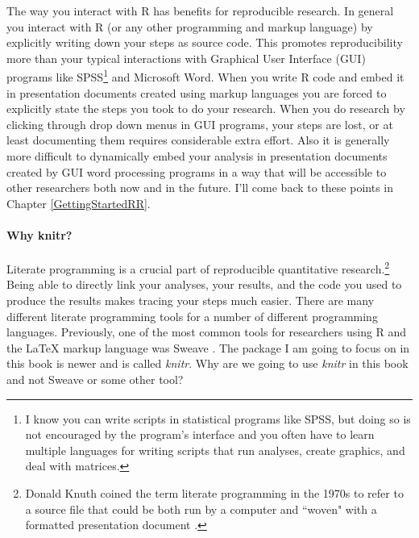 \documentclass[krantz1]{krantz}
\begin{document}
The way you interact with R has benefits for reproducible research. In general you interact with R (or any other programming and markup language) by explicitly writing down your steps as source code. This promotes reproducibility more than your typical interactions with Graphical User Interface (GUI) programs like SPSS\footnote{I know you can write scripts in statistical programs like SPSS, but doing so is not encouraged by the program's interface and you often have to learn multiple languages for writing scripts that run analyses, create graphics, and deal with matrices.} and Microsoft Word. When you write R code and embed it in presentation documents created using markup languages you are forced to explicitly state the steps you took to do your research. When you do research by clicking through drop down menus in GUI programs, your steps are lost, or at least documenting them requires considerable extra effort. Also it is generally more difficult to dynamically embed your analysis in presentation documents created by GUI word processing programs in a way that will be accessible to other researchers both now and in the future. I'll come back to these points in Chapter \ref{GettingStartedRR}.

\paragraph{Why knitr?}

Literate programming is a crucial part of reproducible quantitative research.\footnote{Donald Knuth coined the term literate programming in the 1970s to refer to a source file that could be both run by a computer and ``woven" with a formatted presentation document \cite[]{Knuth1992}.} Being able to directly link your analyses, your results, and the code you used to produce the results makes tracing your steps much easier. There are many different literate programming tools for a number of different programming languages. Previously, one of the most common tools for researchers using R and the LaTeX markup language was Sweave \cite[]{Leisch2002}. The package I am going to focus on in this book is newer and is called {\emph{knitr}}. Why are we going to use {\emph{knitr}} in this book and not Sweave or some other tool?
\end{document}
